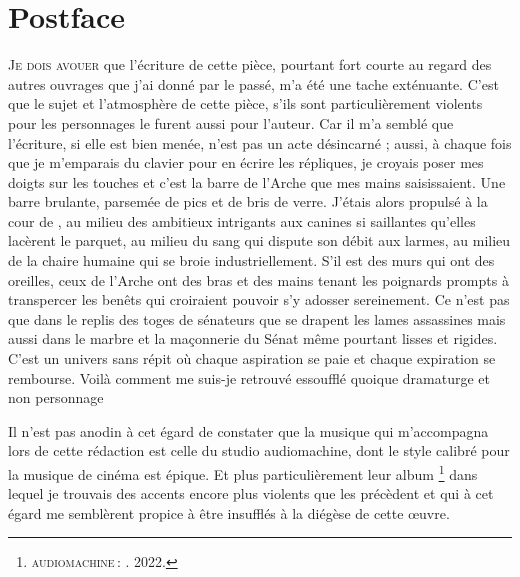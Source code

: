 

\chapter{Postface}

\lettrine[lines=3]{J}{e dois avouer} que l’écriture de cette pièce, pourtant fort courte au regard des autres ouvrages que j’ai donné par le passé, m’a été une tache exténuante. C’est que le sujet et l’atmosphère de cette pièce, s’ils sont particulièrement violents pour les personnages le furent aussi pour l’auteur. Car il m’a semblé que l’écriture, si elle est bien menée, n’est pas un acte désincarné ; aussi, à chaque fois que je m’emparais du clavier pour en écrire les répliques, je croyais poser mes doigts sur les touches et c’est la barre de l’Arche que mes mains saisissaient. Une barre brulante, parsemée de pics et de bris de verre. J’étais alors propulsé à la cour de \campprincipal, au milieu des ambitieux intrigants aux canines si saillantes qu’elles lacèrent le parquet, au milieu du sang qui dispute son débit aux larmes, au milieu de la chaire humaine qui se broie industriellement. S’il est des murs qui ont des oreilles, ceux de l’Arche ont des bras et des mains tenant les poignards prompts à transpercer les benêts qui croiraient pouvoir s’y adosser sereinement. Ce n’est pas que dans le replis des toges de sénateurs que se drapent les lames assassines mais aussi dans le marbre et la maçonnerie du Sénat même pourtant lisses et rigides. C’est un univers sans répit où chaque aspiration se paie et chaque expiration se rembourse. Voilà comment me suis-je retrouvé essoufflé quoique dramaturge et non personnage

Il n’est pas anodin à cet égard de constater que la musique qui m’accompagna lors de cette rédaction est celle du studio audiomachine, dont le style calibré pour la musique de cinéma est épique. Et plus particulièrement leur album \footnote{\textsc{audiomachine} : . 2022.} dans lequel je trouvais des accents encore plus violents que les précèdent et qui à cet égard me semblèrent propice à être insufflés à la diégèse de cette œuvre.

